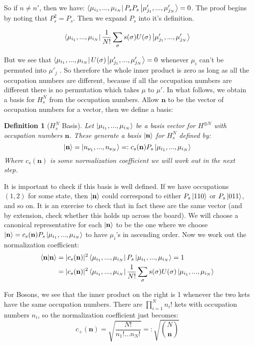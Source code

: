 \documentclass{article}
\newcommand{\ve}[1]{\mathbf{#1}}
\newtheorem{defn}{Definition}
\begin{document}
So if $n \neq n'$, then we have: $\bra{\mu_{i_1},...,\mu_{i_N}}P_s P_s \ket{\mu'_{j_1},...,\mu'_{j_N}} = 0$. The proof begins by noting that $P_s^2=P_s$. Then we expand $P_s$ into it's definition.

\[\bra{\mu_{i_1},...,\mu_{i_N}}\frac{1}{N!} \sum_{\sigma} s(\sigma)U(\sigma) \ket{\mu'_{j_1},...,\mu'_{j_N}}\]

But we see that $\bra{\mu_{i_1},...,\mu_{i_N}}U(\sigma)\ket{\mu'_{j_1},...,\mu'_{j_N}} = 0$ whenever $\mu_{i}$ can't be permuted into $\mu'_j$ . So therefore the whole inner product is zero as long as all the occupation numbers are different, because if all the occupation numbers are different there is no permutation which takes $\mu$ to $\mu'$. In what follows, we obtain a basis for $H_s^N$ from the occupation numbers. Allow $\ve{n}$ to be the vector of occupation numbers for a vector, then we define a basis:

\begin{defn}[$H_s^N$ Basis]
Let $\ket{\mu_{i_1},...,\mu_{i_N}}$ be a basis vector for $H^{\otimes N}$ with occupation numbers $\ve{n}$. These generate a basis $\ket{\ve{n}}$ for $H_s^N$ defined by:
\begin{equation}
\ket{\ve{n}} = \ket{n_{\nu_1},...,n_{\nu_N}} =: c_s(\ve{n})P_s\ket{\mu_{i_1},...,\mu_{i_N}}
\end{equation}
Where $c_s(\ve{n})$ is some normalization coefficient we will work out in the next step.
\end{defn}

It is important to check if this basis is well defined. If we have occupations $(1,2)$ for some state, then $\ket{\ve{n}}$ could correspond to either $P_s\ket{110}$ or $P_s\ket{011}$, and so on. It is an exercise to check that in fact these are the same vector (and by extension, check whether this holds up across the board). We will choose a canonical representative for each $\ket{\ve{n}}$ to be the one where we choose $\ket{\ve{n}} = c_s(\ve{n})P_s\ket{\mu_{i_1},...,\mu_{i_N}}$ to have $\mu_i$'s in ascending order. Now we work out the normalization coefficient:
\begin{align}
\braket{\ve{n}} &= |c_s(\ve{n})|^2 \bra{\mu_{i_1},...,\mu_{i_N}}P_s\ket{\mu_{i_1},...,\mu_{i_N}} = 1\\
&=  |c_s(\ve{n})|^2 \bra{\mu_{i_1},...,\mu_{i_N}}\frac{1}{N!}\sum_\sigma s(\sigma)U(\sigma)\ket{\mu_{i_1},...,\mu_{i_N}}
\end{align}

For Bosons, we see that the inner product on the right is 1 whenever the two kets have the same occupation numbers. There are $\prod_{i=1}^N n_i!$ kets with occupation numbers $n_i$, so the normalization coefficient just becomes:
\begin{equation}
c_+(\ve{n}) = \sqrt{\frac{N!}{n_1!...n_N!}} =: \sqrt{{N\choose{\ve{n}}}}
\end{equation}
\end{document}
